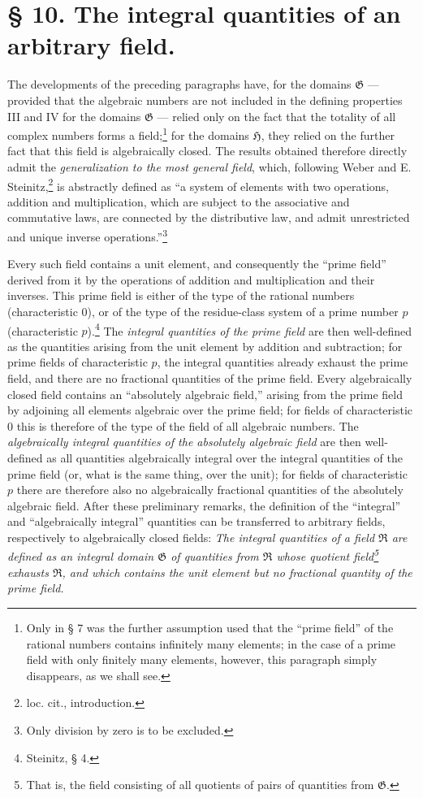\documentclass[11pt]{article}
\begin{document}
\section*{§ 10. The integral quantities of an arbitrary field.}

The developments of the preceding paragraphs have, for the domains
$\mathfrak G$ --- provided that the algebraic numbers are not included in the
defining properties III and IV for the domains $\mathfrak G$ --- relied only on
the fact that the totality of all complex numbers forms a field;\footnote{Only
in § 7 was the further assumption used that the ``prime field'' of the rational
numbers contains infinitely many elements; in the case of a prime field with only
finitely many elements, however, this paragraph simply disappears, as we shall
see.} for the domains $\mathfrak H$, they relied on the further fact that this
field is algebraically closed. The results obtained therefore directly admit the
\emph{generalization to the most general field}, which, following Weber and
E. Steinitz,\footnote{loc. cit., introduction.} is abstractly defined as ``a
system of elements with two operations, addition and multiplication, which are
subject to the associative and commutative laws, are connected by the
distributive law, and admit unrestricted and unique inverse operations.''\footnote{Only
division by zero is to be excluded.}

Every such field contains a unit element, and consequently the ``prime field''
derived from it by the operations of addition and multiplication and their
inverses. This prime field is either of the type of the rational numbers
(characteristic $0$), or of the type of the residue-class system of a prime
number $p$ (characteristic $p$).\footnote{Steinitz, § 4.} The \emph{integral
quantities of the prime field} are then well-defined as the quantities arising
from the unit element by addition and subtraction; for prime fields of
characteristic $p$, the integral quantities already exhaust the prime field, and
there are no fractional quantities of the prime field. Every algebraically closed
field contains an ``absolutely algebraic field,'' arising from the prime field by
adjoining all elements algebraic over the prime field; for fields of
characteristic $0$ this is therefore of the type of the field of all algebraic
numbers. The \emph{algebraically integral quantities of the absolutely algebraic
field} are then well-defined as all quantities algebraically integral over the
integral quantities of the prime field (or, what is the same thing, over the
unit); for fields of characteristic $p$ there are therefore also no algebraically
fractional quantities of the absolutely algebraic field. After these preliminary
remarks, the definition of the ``integral'' and ``algebraically integral''
quantities can be transferred to arbitrary fields, respectively to algebraically
closed fields: \emph{The integral quantities of a field $\mathfrak R$ are
defined as an integral domain $\mathfrak G$ of quantities from $\mathfrak R$
whose quotient field\footnote{That is, the field consisting of all quotients of
pairs of quantities from $\mathfrak G$.} exhausts $\mathfrak R$, and which
contains the unit element but no fractional quantity of the prime field.}
\end{document}
